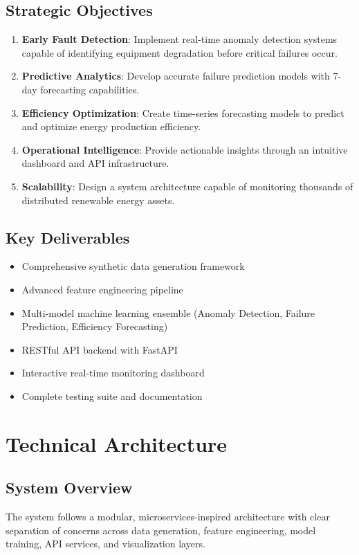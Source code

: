 \documentclass[12pt,a4paper]{article}
\begin{document}
\subsection{Strategic Objectives}
\begin{enumerate}[leftmargin=*]
    \item \textbf{Early Fault Detection}: Implement real-time anomaly detection systems capable of identifying equipment degradation before critical failures occur.
    \item \textbf{Predictive Analytics}: Develop accurate failure prediction models with 7-day forecasting capabilities.
    \item \textbf{Efficiency Optimization}: Create time-series forecasting models to predict and optimize energy production efficiency.
    \item \textbf{Operational Intelligence}: Provide actionable insights through an intuitive dashboard and API infrastructure.
    \item \textbf{Scalability}: Design a system architecture capable of monitoring thousands of distributed renewable energy assets.
\end{enumerate}

\subsection{Key Deliverables}
\begin{itemize}[leftmargin=*]
    \item Comprehensive synthetic data generation framework
    \item Advanced feature engineering pipeline
    \item Multi-model machine learning ensemble (Anomaly Detection, Failure Prediction, Efficiency Forecasting)
    \item RESTful API backend with FastAPI
    \item Interactive real-time monitoring dashboard
    \item Complete testing suite and documentation
\end{itemize}

\newpage

\section{Technical Architecture}

\subsection{System Overview}
The system follows a modular, microservices-inspired architecture with clear separation of concerns across data generation, feature engineering, model training, API services, and visualization layers.
\end{document}
